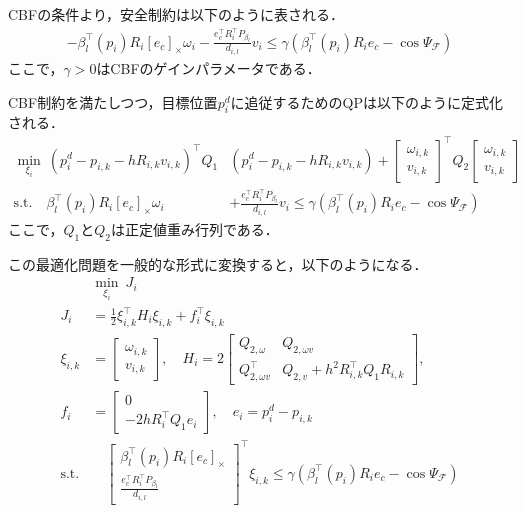 CBFの条件より，安全制約は以下のように表される．
\begin{equation}
\begin{aligned}
-\beta_l^\top(p_i) R_i [e_c]_\times\omega_i - \frac{e_c^\top R_i^\top P_{\beta_l}}{d_{i,l}}v_i \leq \gamma (\beta_l^{\top}(p_i)R_ie_c-\cos\Psi_\mathcal{F})
\label{eq:cbf_constraint_single}
\end{aligned}
\end{equation}
ここで，$\gamma > 0$はCBFのゲインパラメータである．

CBF制約を満たしつつ，目標位置$p_i^d$に追従するためのQPは以下のように定式化される．
\begin{equation}
\begin{aligned}
\min_{\xi_i} \: (p^d_{i}-p_{i,{k}}-hR_{i,k}v_{i,k})^\top Q_1 & (p^d_{i}-p_{i,{k}}-hR_{i,k}v_{i,k})
+ 
\begin{bmatrix}
\omega_{i,k}\\v_{i,k}
\end{bmatrix}^\top Q_2
\begin{bmatrix}
\omega_{i,k}\\v_{i,k}
\end{bmatrix} \\
\mathrm{s.t.} \quad
\beta_l^\top(p_i) R_i [e_c]_\times\omega_i &+ \frac{e_c^\top R_i^\top P_{\beta_l}}{d_{i,l}}v_i \leq \gamma (\beta_l^{\top}(p_i)R_ie_c-\cos\Psi_\mathcal{F})
\label{eq:qp_single}
\end{aligned}
\end{equation}
ここで，$Q_1$と$Q_2$は正定値重み行列である．

この最適化問題を一般的な形式に変換すると，以下のようになる．
\begin{equation}
\begin{aligned}
&\min_{\xi_i}\:J_i \\
J_i &= \frac{1}{2}\xi_{i,k}^\top H_i \xi_{i,k} + f_i^\top \xi_{i,k} \\
\xi_{i,k} &= \begin{bmatrix}
\omega_{i,k}\\v_{i,k}
\end{bmatrix}, \quad
H_i = 2\begin{bmatrix}
Q_{2,\omega} & Q_{2,\omega v} \\ 
Q^\top_{2,\omega v} & Q_{2,v}+h^2R_{i,k}^\top Q_1R_{i,k}
\end{bmatrix}, \\
f_i &= \begin{bmatrix}
0 \\ -2hR_i^\top Q_1 e_i
\end{bmatrix}, \quad e_i = p^d_{i}-p_{i,k} \\
\mathrm{s.t.} &\quad
\begin{bmatrix}
\beta_l^\top(p_i) R_i [e_c]_\times \\
\frac{e_c^\top R_i^\top P_{\beta_l}}{d_{i,l}}
\end{bmatrix}^\top \xi_{i,k} \leq
\gamma (\beta_l^{\top}(p_i)R_ie_c-\cos\Psi_\mathcal{F})
\label{eq:qp_single_general}
\end{aligned}
\end{equation}

